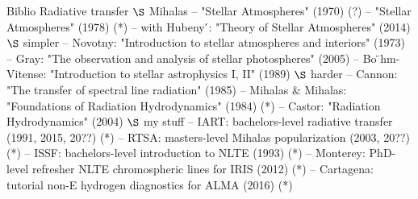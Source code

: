 \begin{frame}{Biblio Radiative transfer}
$\S$ Mihalas
– "Stellar Atmospheres" (1970) (?)
– "Stellar Atmospheres" (1978) (*)
– with Hubeny ́: "Theory of Stellar Atmospheres" (2014)
$\S$ simpler
– Novotny: "Introduction to stellar atmospheres and interiors" (1973)
– Gray: "The observation and analysis of stellar photospheres" (2005) – Bo ̈hm-Vitense: "Introduction to stellar astrophysics I, II" (1989)
$\S$ harder
– Cannon: "The transfer of spectral line radiation" (1985)
– Mihalas & Mihalas: "Foundations of Radiation Hydrodynamics" (1984) (*) – Castor: "Radiation Hydrodynamics" (2004)
$\S$ my stuff
– IART: bachelors-level radiative transfer (1991, 2015, 20??) (*)
– RTSA: masters-level Mihalas popularization (2003, 20??) (*)
– ISSF: bachelors-level introduction to NLTE (1993) (*)
– Monterey: PhD-level refresher NLTE chromospheric lines for IRIS (2012) (*) – Cartagena: tutorial non-E hydrogen diagnostics for ALMA (2016) (*)
\end{frame}

